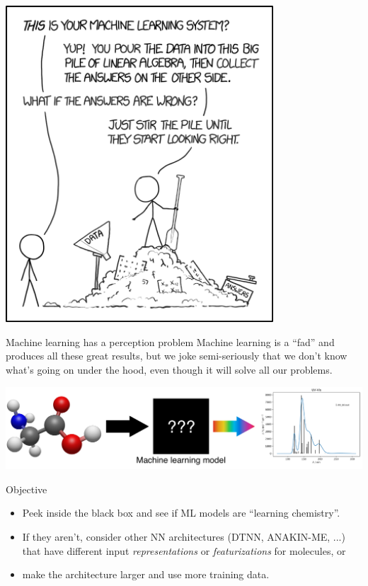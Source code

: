 \documentclass[xetex,compress]{beamer}
\begin{document}
\begin{frame}{}
  \begin{center}
    \includegraphics[width=0.75\textwidth]{./figures/machine_learning.png}
  \end{center}
\end{frame}

\begin{frame}{Machine learning has a perception problem}
  Machine learning is a ``fad'' and produces all these great results, but we joke semi-seriously that we don't know what's going on under the hood, even though it will solve all our problems.
  \begin{center}
    \includegraphics[width=1.00\textwidth]{./figures/black_box_prediction.pdf}
  \end{center}
\end{frame}

\begin{frame}{Objective}
  \begin{itemize}
  \item Peek inside the black box and see if ML models are ``learning chemistry''.
  \item If they aren't, consider other NN architectures (DTNN, ANAKIN-ME, ...) that have different input \textit{representations} or \textit{featurizations} for molecules, or
  \item make the architecture larger and use more training data.
  \end{itemize}
\end{frame}
\end{document}
